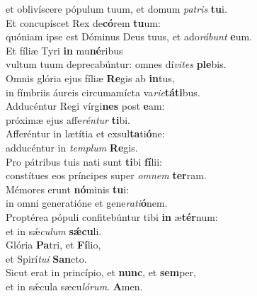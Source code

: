 \evenverse et oblivíscere pópulum tuum, et domum \textit{pa}\textit{tris} \textbf{tu}i.\\
\oddverse Et concupíscet Rex de\textbf{có}rem \textbf{tu}um:~\*\\
\oddverse quóniam ipse est Dóminus Deus tuus, et ado\textit{rá}\textit{bunt} \textbf{e}um.\\
\evenverse Et fíliæ Tyri \textbf{in} mu\textbf{né}ribus~\*\\
\evenverse vultum tuum deprecabúntur: omnes dí\textit{vi}\textit{tes} \textbf{ple}bis.\\
\oddverse Omnis glória ejus fíliæ \textbf{Re}gis ab \textbf{in}tus,~\*\\
\oddverse in fímbriis áureis circumamícta va\textit{ri}\textit{e}\textbf{tá}\textbf{ti}bus.\\
\evenverse Adducéntur Regi vírgi\textbf{nes} post \textbf{e}am:~\*\\
\evenverse próximæ ejus affe\textit{rén}\textit{tur} \textbf{ti}bi.\\
\oddverse Afferéntur in lætítia et exsul\textbf{ta}ti\textbf{ó}ne:~\*\\
\oddverse adducéntur in \textit{tem}\textit{plum} \textbf{Re}gis.\\
\evenverse Pro pátribus tuis nati sunt \textbf{ti}bi \textbf{fí}lii:~\*\\
\evenverse constítues eos príncipes super \textit{om}\textit{nem} \textbf{ter}ram.\\
\oddverse Mémores erunt \textbf{nó}minis \textbf{tu}i:~\*\\
\oddverse in omni generatióne et gene\textit{ra}\textit{ti}\textbf{ó}nem.\\
\evenverse Proptérea pópuli confitebúntur tibi \textbf{in} æ\textbf{tér}num:~\*\\
\evenverse et in sǽ\textit{cu}\textit{lum} \textbf{sǽ}\textbf{cu}li.\\
\oddverse Glória \textbf{Pa}tri, et \textbf{Fí}lio,~\*\\
\oddverse et Spirí\textit{tu}\textit{i} \textbf{San}cto.\\
\evenverse Sicut erat in princípio, et \textbf{nunc}, et \textbf{sem}per,~\*\\
\evenverse et in sǽcula sæcu\textit{ló}\textit{rum}. \textbf{A}men.\\
